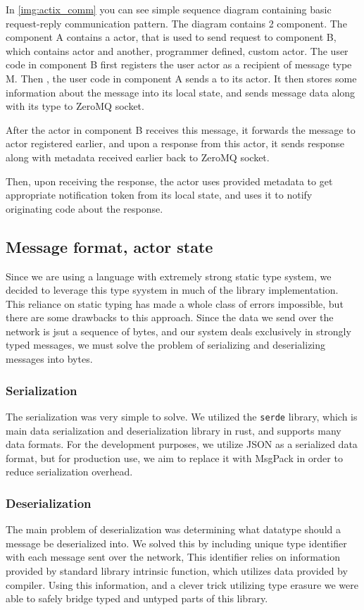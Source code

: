 In \autoref{img:actix_comm} you can see simple sequence diagram containing basic request-reply communication pattern.
The diagram contains 2 component. The component A contains a   actor, that is used to send request to
component B, which contains  actor and another, programmer defined, custom actor.
The user code in component B first
registers the user actor as a recipient of message type M. Then , the user code in component A sends a 
to its  actor. It then stores some information about the message into its local state, and sends message
data along with its type to ZeroMQ socket.

After the  actor in component B receives this message, it forwards the message to actor registered earlier,
and upon a response from this actor, it sends response along with metadata received earlier back to ZeroMQ socket.

Then, upon receiving the response, the  actor uses provided metadata to get appropriate notification
token from its local state, and uses it to notify originating code about the response.

\subsection{Message format, actor state}
Since we are using a language with extremely strong static type system, we decided to leverage this type syystem in much
of the library implementation. This reliance on static typing has made a whole class of errors impossible, but there
are some drawbacks to this approach. Since the data we send over the network is jsut a sequence of bytes, and our system
deals exclusively in strongly typed messages, we must solve the problem of serializing and deserializing messages into bytes.

\subsubsection{Serialization}
The serialization was very simple to solve. We utilized the \verb|serde| library, which is main data serialization and deserialization
library in rust, and supports many data formats. For the development purposes, we utilize JSON as a serialized data format,
but for production use, we aim to replace it with MsgPack in order to reduce serialization overhead.

\subsubsection{Deserialization}
The main problem of deserialization was determining what datatype should a message be deserialized into.
We solved this by including unique type identifier with each message sent over the network, This identifier relies
on information provided by standard library intrinsic function, which utilizes data provided by compiler.
Using this information, and a clever trick utilizing type erasure we were able to safely bridge typed and untyped
parts of this library.

